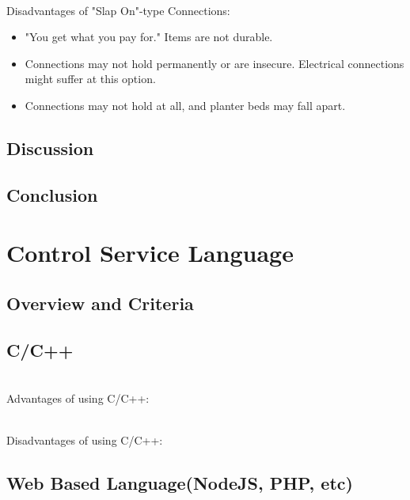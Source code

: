 \documentclass[onecolumn, draftclsnofoot,10pt, compsoc]{IEEEtran}
\begin{document}
		\noindent \\Disadvantages of "Slap On"-type Connections:
		\begin{itemize}
			\item "You get what you pay for." Items are not durable.
			\item Connections may not hold permanently or are insecure.  Electrical connections might suffer at this option.
			\item Connections may not hold at all, and planter beds may fall apart.
		\end{itemize}


		\subsection{Discussion}

		\subsection{Conclusion}



		\section{Control Service Language}

			\subsection{Overview and Criteria}

			\subsection{C/C++}

			\noindent \\Advantages of using C/C++:

			\noindent \\Disadvantages of using C/C++:


			\subsection{Web Based Language(NodeJS, PHP, etc)}
\end{document}
